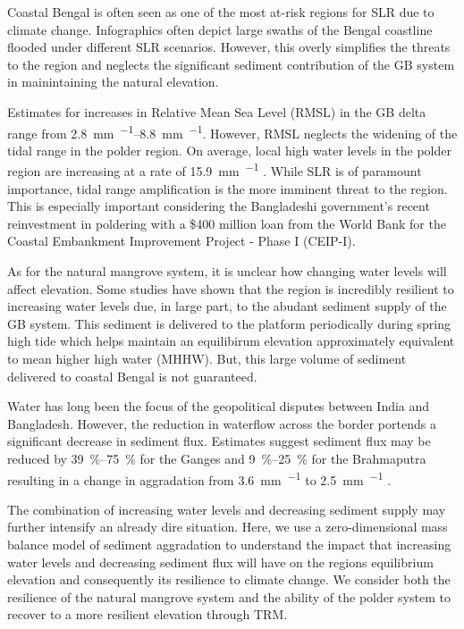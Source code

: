 Coastal Bengal is often seen as one of the most at-risk regions for SLR due to climate change. Infographics often depict large swaths of the Bengal coastline flooded under different SLR scenarios. However, this overly simplifies the threats to the region and neglects the significant sediment contribution of the GB system in mainintaining the natural elevation.

Estimates for increases in Relative Mean Sea Level (RMSL) in the GB delta range from \SIrange{2.8}{8.8}{\milli\meter\per\year}. However, RMSL neglects the widening of the tidal range in the polder region. On average, local high water levels in the polder region are increasing at a rate of \SI{15.9}{\milli\meter\per\year} \citep{pethickRapidRiseEffective2013}. While SLR is of paramount importance, tidal range amplification is the more imminent threat to the region. This is especially important considering the Bangladeshi government's recent reinvestment in poldering with a \$400 million loan from the World Bank for the Coastal Embankment Improvement Project - Phase I (CEIP-I).

As for the natural mangrove system, it is unclear how changing water levels will affect elevation. Some studies have shown that the region is incredibly resilient to increasing water levels due, in large part, to the abudant sediment supply of the GB system. This sediment is delivered to the platform periodically during spring high tide which helps maintain an equilibirum elevation approximately equivalent to mean higher high water (MHHW). But, this large volume of sediment delivered to coastal Bengal is not guaranteed.

Water has long been the focus of the geopolitical disputes between India and Bangladesh. However, the reduction in waterflow across the border portends a significant decrease in sediment flux. Estimates suggest sediment flux may be reduced by \SIrange{39}{75}{\percent} for the Ganges and \SIrange{9}{25}{\percent} for the Brahmaputra resulting in a change in aggradation from \SI{3.6}{\milli\meter\per\year} to \SI{2.5}{\milli\meter\per\year} \citep{higginsRiverLinkingIndia2018}.

The combination of increasing water levels and decreasing sediment supply may further intensify an already dire situation. Here, we use a zero-dimensional mass balance model of sediment aggradation to understand the impact that increasing water levels and decreasing sediment flux will have on the regions equilibrium elevation and consequently its resilience to climate change. We consider both the resilience of the natural mangrove system and the ability of the polder system to recover to a more resilient elevation through TRM.